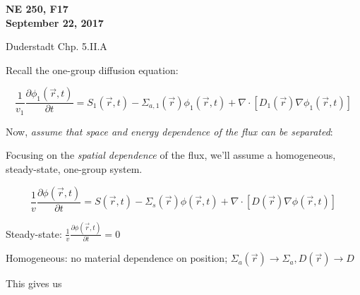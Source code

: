 \documentclass[12pt]{article}
\newif\ifeqns
\newcommand{\rvec}{\ensuremath{\vec{r}}}
\newcommand{\vecr}{\ensuremath{\vec{r}}}
\begin{document}
\begin{center}
{\bf NE 250, F17\\
September 22, 2017 
}
\end{center}

Duderstadt Chp. 5.II.A

Recall the one-group diffusion equation:

\begin{equation*}
\frac{1}{v_1}\frac{\partial \phi_1(\rvec,t)}{\partial t} = S_1(\rvec,t) - 
\Sigma_{a,1}(\rvec)\phi_1(\rvec,t) + \nabla\cdot[D_1(\rvec)\nabla\phi_1(\rvec,t)]
\end{equation*}

Now, \textit{assume that space and energy dependence of the flux can be separated}:
\ifeqns
\begin{equation*}
\phi(\vecr,E,t) = \phi(\vecr,t)\xi(E), 
\text{ where $\xi(E)$ is the neutron spectrum and $\int_0^{\infty}dE\:\psi(E) = 1$.}
\end{equation*}
\else
\vspace*{3em}
\fi

Focusing on the \textit{spatial dependence} of the flux, we'll assume a homogeneous, steady-state, one-group system.

\begin{equation*}
\frac{1}{v}\frac{\partial\phi(\rvec,t)}{\partial t} = S(\rvec,t) - \Sigma_s(\rvec)\phi(\rvec,t)
+ \nabla\cdot[D(\rvec)\nabla\phi(\rvec,t)]
\end{equation*}

Steady-state: $\frac{1}{v}\frac{\partial\phi(\rvec,t)}{\partial t} = 0$

Homogeneous: no material dependence on position; 
$\Sigma_a(\rvec)\rightarrow\Sigma_a, D(\rvec)\rightarrow D$

This gives us
%
%
%
\ifeqns
\begin{equation*}
\nabla^2\phi(\vecr) - \frac{1}{L^2}\phi(\rvec) = -\frac{S(\rvec)}{D},
\text{ where $L = \sqrt{\frac{D}{\Sigma_a}} =$ diffusion length.}
\end{equation*}
\else
\vspace*{3em}
\fi

\end{document}
